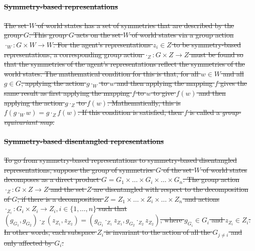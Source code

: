 \paragraph{\sout{Symmetry-based representations}}
\sout{
The set $W$ of world states has a set of symmetries that are described by the group $G$.
This group $G$ acts on the set $W$ of world states via a group action $\cdot_{W}: G \times W \to W$.
For the agent's representations $z_i \in Z$ to be symmetry-based representations, a corresponding group action $\cdot_{Z}: G \times Z \to Z$ must be found so that the symmetries of the agent's representations reflect the symmetries of the world states.
The mathematical condition for this is that, for all $w \in W$ and all $g \in G$, applying the action $g \cdot_W$ to $w$ and then applying the mapping $f$ gives the same result as first applying the mapping $f$ to $w$ to give $f(w)$ and then applying the action $g \cdot_Z$ to $f(w)$.
Mathematically, this is $f(g \cdot_W w) = g \cdot_Z f(w)$.
If this condition is satisfied, then $f$ is called a \textit{group-equivariant map}.
}

\paragraph{\sout{Symmetry-based disentangled representations}}
\sout{
To go from symmetry-based representations to symmetry-based disentangled representations, suppose the group of symmetries $G$ of the set $W$ of world states decomposes as a direct product $G = G_1 \times \hdots \times G_i \times \hdots \times G_n$.
The group action $\cdot_Z : G \times Z \to Z$ and the set $Z$ are disentangled with respect to the decomposition of $G$, if there is a decomposition $Z = Z_1 \times \hdots \times Z_i \times \hdots \times Z_n$ and actions $\cdot_{Z_i}: G_i \times Z_i \to Z_i, i \in \{1, \hdots, n\}$ such that $(g_{G_1}, g_{G_2}) \cdot_Z (z_{Z_1}, z_{Z_2}) = (g_{G_1} \cdot_{Z_1} z_{Z_1}, g_{G_2} \cdot_{Z_2} z_{Z_2})$, where $g_{G_i} \in G_i$ and $z_{Z_i} \in Z_i$.
In other words, each subspace $Z_i$ is invariant to the action of all the $G_{j \neq i}$ and only affected by $G_i$.
}


